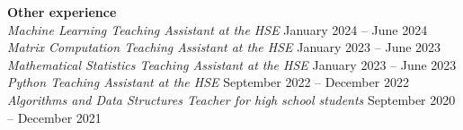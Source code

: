 \textbf{Other experience} \hfill \\
\textit{Machine Learning Teaching Assistant at the HSE} \hfill January 2024 -- June 2024\\ 
\textit{Matrix Computation Teaching Assistant at the HSE} \hfill January 2023 -- June 2023\\ 
\textit{Mathematical Statistics Teaching Assistant at the HSE} \hfill January 2023 -- June 2023\\ 
\textit{Python Teaching Assistant at the HSE} \hfill September 2022 -- December 2022\\
\textit{Algorithms and Data Structures Teacher for high school students} \hfill September 2020 -- December 2021\\